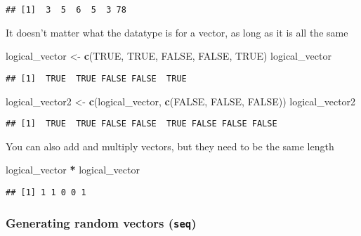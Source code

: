\documentclass[]{article}
\newenvironment{Shaded}{\begin{snugshade}}{\end{snugshade}}
\newcommand{\KeywordTok}[1]{\textcolor[rgb]{0.13,0.29,0.53}{\textbf{#1}}}
\newcommand{\StringTok}[1]{\textcolor[rgb]{0.31,0.60,0.02}{#1}}
\newcommand{\OtherTok}[1]{\textcolor[rgb]{0.56,0.35,0.01}{#1}}
\newcommand{\OperatorTok}[1]{\textcolor[rgb]{0.81,0.36,0.00}{\textbf{#1}}}
\newcommand{\NormalTok}[1]{#1}
\begin{document}
\begin{verbatim}
## [1]  3  5  6  5  3 78
\end{verbatim}

It doesn't matter what the datatype is for a vector, as long as it is
all the same

\begin{Shaded}
\begin{Highlighting}[]
\NormalTok{logical_vector <-}\StringTok{ }\KeywordTok{c}\NormalTok{(}\OtherTok{TRUE}\NormalTok{, }\OtherTok{TRUE}\NormalTok{, }\OtherTok{FALSE}\NormalTok{, }\OtherTok{FALSE}\NormalTok{, }\OtherTok{TRUE}\NormalTok{)}
\NormalTok{logical_vector}
\end{Highlighting}
\end{Shaded}

\begin{verbatim}
## [1]  TRUE  TRUE FALSE FALSE  TRUE
\end{verbatim}

\begin{Shaded}
\begin{Highlighting}[]
\NormalTok{logical_vector2 <-}\StringTok{ }\KeywordTok{c}\NormalTok{(logical_vector, }\KeywordTok{c}\NormalTok{(}\OtherTok{FALSE}\NormalTok{, }\OtherTok{FALSE}\NormalTok{, }\OtherTok{FALSE}\NormalTok{))}
\NormalTok{logical_vector2}
\end{Highlighting}
\end{Shaded}

\begin{verbatim}
## [1]  TRUE  TRUE FALSE FALSE  TRUE FALSE FALSE FALSE
\end{verbatim}

You can also add and multiply vectors, but they need to be the same
length

\begin{Shaded}
\begin{Highlighting}[]
\NormalTok{logical_vector }\OperatorTok{*}\StringTok{ }\NormalTok{logical_vector}
\end{Highlighting}
\end{Shaded}

\begin{verbatim}
## [1] 1 1 0 0 1
\end{verbatim}

\subsubsection{\texorpdfstring{Generating random vectors
(\texttt{seq})}{Generating random vectors (seq)}}\label{generating-random-vectors-seq}
\end{document}
